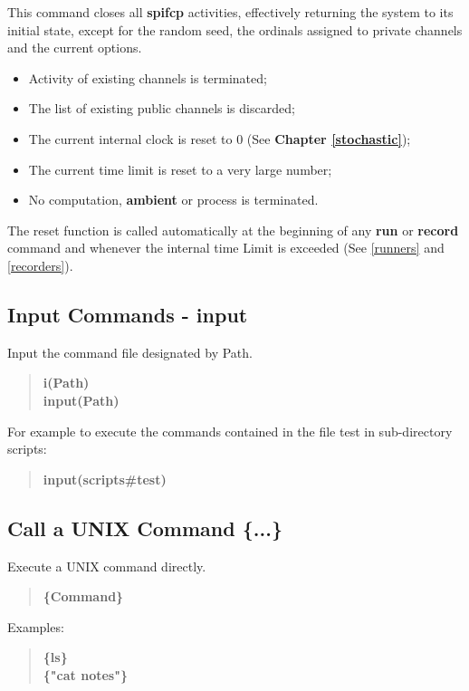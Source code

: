 \documentclass[twoside,10pt]{report}
\begin{document}
This command closes all {\bf spifcp} activities,
effectively returning the system to its initial state,
except for the random seed, the ordinals assigned to
private channels and the current options.

\begin{itemize}
\item Activity of existing channels is terminated;
\item The list of existing public channels is discarded;
\item The current internal clock is reset to 0
      (See {\bf Chapter \ref{stochastic}});
\item The current time limit is reset to a very large number;
\item No computation, {\bf ambient} or process is terminated.
\end{itemize}

\noindent
The reset function is called automatically at the beginning of
any {\bf run} or {\bf record} command and whenever the internal
time Limit is exceeded
(See \ref{runners} and  \ref{recorders}).

\subsection{Input Commands - input}

Input the command file designated by Path.  

\begin{verse}
 {\bfseries
    i(Path) \\
    input(Path)
 }
\end{verse}

\noindent
For example to execute
the commands contained in the file test in sub-directory scripts:

\begin{verse}
 {\bfseries
    input(scripts\#test)
 }
\end{verse}

\subsection{Call a UNIX Command \{...\}}

Execute a UNIX command directly.

\begin{verse}
 {\bfseries
    \{Command\}
 }
\end{verse}

\noindent
Examples:

\begin{verse}
 {\bfseries
    \{ls\} \\
    \{"cat notes"\}
 }
\end{verse}
\end{document}
